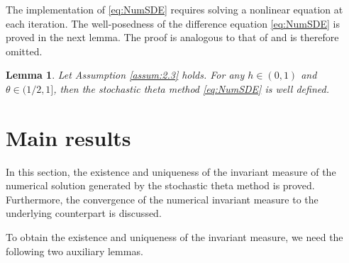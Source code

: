 \documentclass{article}
\newtheorem{lemma}[theorem]{Lemma}
\begin{document}
The implementation of \eqref{eq:NumSDE} requires solving a nonlinear equation at each iteration. The well-posedness of the difference equation \eqref{eq:NumSDE} is proved in the next lemma. The proof is analogous to that of \cite{JiangWengLiu2020} and is therefore omitted.

\begin{lemma}
Let Assumption \ref{assum:2.3} holds. For any $h\in(0,1)$ and $\theta\in(1/2,1]$, then the stochastic theta method \eqref{eq:NumSDE} is well defined.
\end{lemma}

\section{Main results}\label{sec:results}
In this section, the existence and uniqueness of the invariant measure of the numerical solution generated by the stochastic theta method is proved. Furthermore, the convergence of the numerical invariant measure to the underlying counterpart is discussed.

To obtain the existence and uniqueness of the invariant measure, we need the following two auxiliary lemmas.
\end{document}
